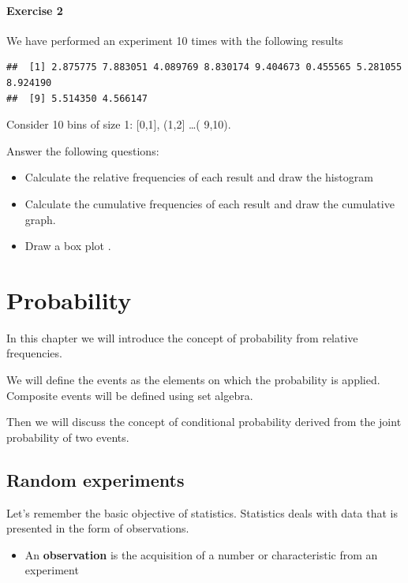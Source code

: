 \documentclass[
]{book}
\providecommand{\tightlist}{%
  \setlength{\itemsep}{0pt}\setlength{\parskip}{0pt}}
\begin{document}
\hypertarget{exercise-2}{%
\subsubsection{Exercise 2}\label{exercise-2}}

We have performed an experiment 10 times with the following results

\begin{verbatim}
##  [1] 2.875775 7.883051 4.089769 8.830174 9.404673 0.455565 5.281055 8.924190
##  [9] 5.514350 4.566147
\end{verbatim}

Consider 10 bins of size 1: {[}0,1{]}, (1,2{]} \ldots( 9,10).

Answer the following questions:

\begin{itemize}
\item
  Calculate the relative frequencies of each result and draw the histogram
\item
  Calculate the cumulative frequencies of each result and draw the cumulative graph.
\item
  Draw a box plot .
\end{itemize}

\hypertarget{probability}{%
\chapter{Probability}\label{probability}}

In this chapter we will introduce the concept of probability from relative frequencies.

We will define the events as the elements on which the probability is applied. Composite events will be defined using set algebra.

Then we will discuss the concept of conditional probability derived from the joint probability of two events.

\hypertarget{random-experiments-1}{%
\section{Random experiments}\label{random-experiments-1}}

Let's remember the basic objective of statistics. Statistics deals with data that is presented in the form of observations.

\begin{itemize}
\tightlist
\item
  An \textbf{observation} is the acquisition of a number or characteristic from an experiment
\end{itemize}
\end{document}
